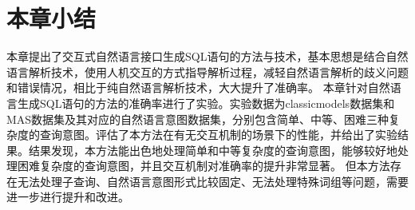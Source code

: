\section{本章小结}
本章提出了交互式自然语言接口生成SQL语句的方法与技术，基本思想是结合自然语言解析技术，使用人机交互的方式指导解析过程，减轻自然语言解析的歧义问题和错误情况，相比于纯自然语言解析技术，大大提升了准确率。
本章针对自然语言生成SQL语句的方法的准确率进行了实验。实验数据为classicmodels数据集和MAS数据集及其对应的自然语言意图数据集，分别包含简单、中等、困难三种复杂度的查询意图。评估了本方法在有无交互机制的场景下的性能，并给出了实验结果。结果发现，本方法能出色地处理简单和中等复杂度的查询意图，能够较好地处理困难复杂度的查询意图，并且交互机制对准确率的提升非常显著。
但本方法存在无法处理子查询、自然语言意图形式比较固定、无法处理特殊词组等问题，需要进一步进行提升和改进。




